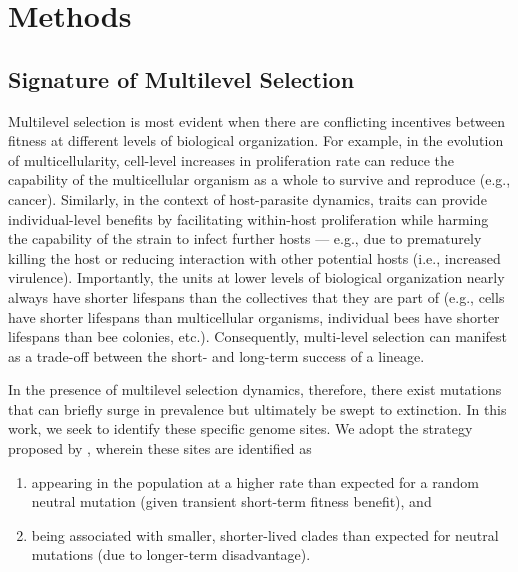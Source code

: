 \section{Methods} \label{sec:methods}

\subsection{Signature of Multilevel Selection}

Multilevel selection is most evident when there are conflicting incentives between fitness at different levels of biological organization.
For example, in the evolution of multicellularity, cell-level increases in proliferation rate can reduce the capability of the multicellular organism as a whole to survive and reproduce (e.g., cancer).
Similarly, in the context of host-parasite dynamics, traits can provide individual-level benefits by facilitating within-host proliferation while harming the capability of the strain to infect further hosts --- e.g., due to prematurely killing the host or reducing interaction with other potential hosts (i.e., increased virulence).
Importantly, the units at lower levels of biological organization nearly always have shorter lifespans than the collectives that they are part of (e.g., cells have shorter lifespans than multicellular organisms, individual bees have shorter lifespans than bee colonies, etc.). Consequently, multi-level selection can manifest as a trade-off between the short- and long-term success of a lineage.



In the presence of multilevel selection dynamics, therefore, there exist mutations that can briefly surge in prevalence but ultimately be swept to extinction.
In this work, we seek to identify these specific genome sites.
We adopt the strategy proposed by \citep{BonettiFranceschi2024phylogenetic}, wherein these sites are identified as
\begin{enumerate}[noitemsep,topsep=0pt,parsep=0pt,partopsep=0pt]
\item appearing in the population at a higher rate than expected for a random neutral mutation (given transient short-term fitness benefit), and
\item being associated with smaller, shorter-lived clades than expected for neutral mutations (due to longer-term disadvantage).
\end{enumerate}


